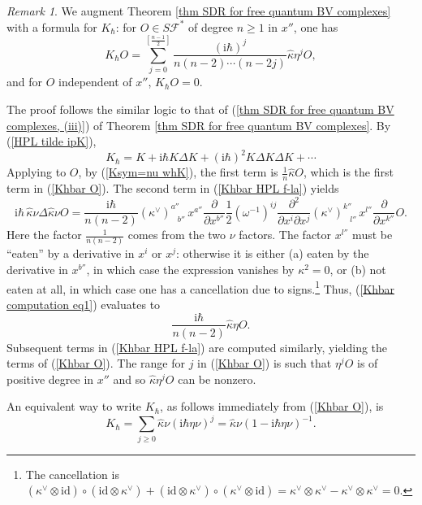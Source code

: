 \documentclass{amsart}
\theoremstyle{plain} %
\theoremstyle{definition}
\theoremstyle{remark}
\newtheorem{rem}[thm]{Remark}
\newcommand{\mr}{\mathrm}
\newcommand{\wh}{\widehat}
\newcommand{\F}{\mathcal{F}}
\newcommand{\dd}{\partial}
\newcommand{\iii}{\mathrm{i}}
\begin{document}
\begin{rem}
    We augment Theorem \ref{thm SDR for free quantum BV complexes} with a formula for $K_\hbar$: for $O\in S\F^*$ of degree $n\geq 1$ in $x''$, one has
    \begin{equation}\label{Khbar O}
        K_\hbar O=
        \sum_{j=0}^{\left[\frac{n-1}{2}\right]} \frac{(\iii\hbar)^j }{n(n-2)\cdots (n-2j)}\wh\kappa \eta^j O,
    \end{equation}
    and for $O$ independent of $x''$, $K_\hbar O=0$.
    
    The proof follows the similar logic to that of (\ref{thm SDR for free quantum BV complexes, (iii)}) of Theorem \ref{thm SDR for free quantum BV complexes}. By (\ref{HPL tilde ipK}), 
    \begin{equation}\label{Khbar HPL f-la}
        K_\hbar=K+\iii\hbar K\Delta K + (\iii\hbar)^2 K\Delta K \Delta K+\cdots
    \end{equation}
    Applying to $O$, by (\ref{Ksym=nu whK}), the first term is $\frac{1}{n}\wh\kappa O$, which is the first term in (\ref{Khbar O}). The second term in (\ref{Khbar HPL f-la}) yields
    \begin{equation}\label{Khbar computation eq1}
        \iii\hbar\,\wh\kappa \nu \Delta\wh\kappa \nu O
        = \frac{\iii\hbar}{n(n-2)} (\kappa^\vee)^{a''}_{\;\;\;b''}\, x^{a''}\frac{\dd}{\dd x^{b''}} 
        \frac12(\omega^{-1})^{ij}\frac{\dd^2}{\dd x^i\dd x^j} (\kappa^\vee)^{k''}_{\;\;\;l''}\, x^{l''} \frac{\dd}{\dd x^{k''}} O.
    \end{equation}
    Here the factor $\frac{1}{n(n-2)}$ comes from the two $\nu$ factors. The factor $x^{l''}$ must be ``eaten'' by a derivative in $x^i$ or $x^j$: otherwise it is either (a) eaten by the derivative in $x^{b''}$, in which case the expression vanishes by $\kappa^2=0$, or (b) not eaten at all, in which case one has a cancellation due to signs.\footnote{
    The cancellation is $(\kappa^\vee\otimes \mr{id})\circ (\mr{id}\otimes\kappa^\vee)+(\mr{id}\otimes\kappa^\vee)\circ (\kappa^\vee\otimes \mr{id}) = \kappa^\vee\otimes \kappa^\vee-\kappa^\vee\otimes \kappa^\vee=0$.
    }
    Thus, (\ref{Khbar computation eq1}) %
    evaluates to
    \begin{equation}
        \frac{\iii\hbar}{n(n-2)}\wh\kappa \eta O.
    \end{equation}
    Subsequent terms in (\ref{Khbar HPL f-la}) are computed similarly, yielding the terms of (\ref{Khbar O}). The range for $j$ in (\ref{Khbar O}) is such that %
    $\eta^jO$ is of positive degree in $x''$ and so $\wh\kappa \eta^jO$ can be nonzero.

    An equivalent way to write $K_\hbar$, as follows immediately from (\ref{Khbar O}), is
    \begin{equation}\label{Khbar via H}
        K_\hbar=\sum_{j\geq 0} \wh\kappa \nu(\iii\hbar \eta\nu)^j
        = \wh\kappa \nu(1-\iii\hbar \eta \nu)^{-1}.
    \end{equation}
\end{rem}
\end{document}

